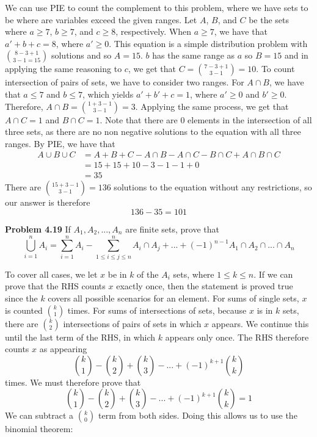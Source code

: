 \documentclass[11pt]{scrartcl}
\begin{document}
\noindent 
We can use PIE to count the complement to this problem, where we have sets to be where are variables exceed the given ranges. Let $A$, $B$, and $C$ be the sets where $a \geq 7$, $b \geq 7$, and $c \geq 8$, respectively. When $a \geq 7$, we have that $a'+b+c=8$, where $a' \geq 0$. This equation is a simple distribution problem with ${8-3+1} \choose {3-1}=15$ solutions and so $A=15$. $b$ has the same range as $a$ so $B=15$ and in applying the same reasoning to $c$, we get that $C={{7-3+1} \choose {3-1}}=10$. To count intersection of pairs of sets, we have to consider two ranges. For $A \cap B$, we have that $a \leq 7$ and $b \leq 7$, which yields $a'+b'+c=1$, where $a' \geq 0$ and $b' \geq 0$. Therefore, ${{A \cap B}}={{1+3-1} \choose {3-1}}=3$. Applying the same process, we get that ${A \cap C}=1$ and ${B \cap C}=1$. Note that there are 0 elements in the intersection of all three sets, as there are no non negative solutions to the equation with all three ranges. By PIE, we have that 
\begin{align*}
{A \cup B \cup C} &={A}+{B}+{C}-{A \cap B}-{A \cap C}-{B \cap C}+{A \cap B \cap C} \\
                  &=15+15+10-3-1-1+0 \\
                  &=35
\end{align*}
There are ${{15+3-1} \choose {3-1}}=136$ solutions to the equation without any restrictions, so our answer is therefore 
$$136-35=101$$
\begin{tcolorbox}
\textbf{Problem 4.19} If $A_1, A_2,...,A_n$ are finite sets, prove that $$\bigcup_{i=1}^{n}A_i={\sum_{i=1}^{n}A_i}-\sum_{1 \leq i \leq j \leq n}^{n} {A_i \cap A_j}+...+(-1)^{n-1}{A_1 \cap A_2\cap...\cap A_n}$$
\end{tcolorbox}
To cover all cases, we let $x$ be in $k$ of the $A_i$ sets, where $1 \leq k \leq n$. If we can prove that the RHS counts $x$ exactly once, then the statement is proved true since the $k$ covers all possible scenarios for an element. For sums of single sets, $x$ is counted ${k \choose 1}$ times. For sums of intersections of sets, because $x$ is in $k$ sets, there are $k \choose 2$ intersections of pairs of sets in which $x$ appears. We continue this until the last term of the RHS, in which $k$ appears only once. The RHS therefore counts $x$  as appearing 
$${k \choose 1}-{k \choose 2}+{k \choose 3}-...+(-1)^{k+1}{k \choose k}$$
times. We must therefore prove that
$${k \choose 1}-{k \choose 2}+{k \choose 3}-...+(-1)^{k+1}{k \choose k}=1$$
We can subtract a ${k \choose 0}$ term from both sides. Doing this allows us to use the binomial theorem:
\end{document}
